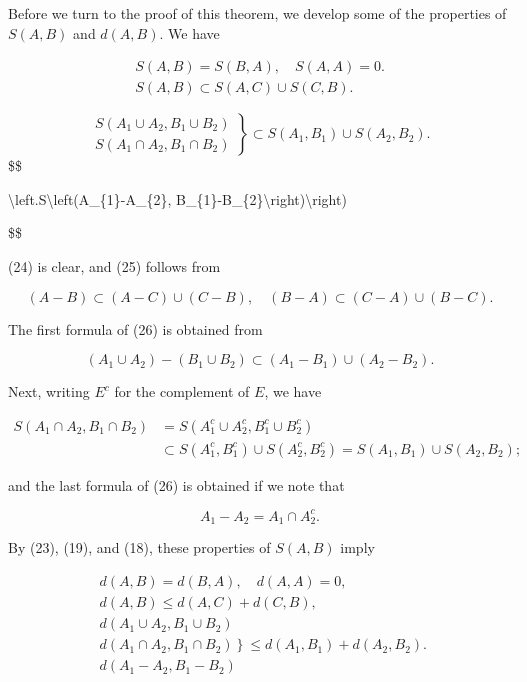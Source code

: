 \documentclass[10pt]{article}
\begin{document}
Before we turn to the proof of this theorem, we develop some of the properties of $S(A, B)$ and $d(A, B)$. We have

$$
\begin{gathered}
S(A, B)=S(B, A), \quad S(A, A)=0 . \\
S(A, B) \subset S(A, C) \cup S(C, B) .
\end{gathered}
$$

$$
\left.\begin{array}{l}
S\left(A_{1} \cup A_{2}, B_{1} \cup B_{2}\right) \\
S\left(A_{1} \cap A_{2}, B_{1} \cap B_{2}\right)
\end{array}\right\} \subset S\left(A_{1}, B_{1}\right) \cup S\left(A_{2}, B_{2}\right) .
$$\$\$

\textbackslash left.S\textbackslash left(A\_\{1\}-A\_\{2\}, B\_\{1\}-B\_\{2\}\textbackslash right)\textbackslash right)

\$\$

(24) is clear, and (25) follows from

$$
(A-B) \subset(A-C) \cup(C-B), \quad(B-A) \subset(C-A) \cup(B-C) .
$$

The first formula of (26) is obtained from

$$
\left(A_{1} \cup A_{2}\right)-\left(B_{1} \cup B_{2}\right) \subset\left(A_{1}-B_{1}\right) \cup\left(A_{2}-B_{2}\right) .
$$

Next, writing $E^{c}$ for the complement of $E$, we have

$$
\begin{aligned}
S\left(A_{1} \cap A_{2}, B_{1} \cap B_{2}\right) & =S\left(A_{1}^{c} \cup A_{2}^{c}, B_{1}^{c} \cup B_{2}^{c}\right) \\
& \subset S\left(A_{1}^{c}, B_{1}^{c}\right) \cup S\left(A_{2}^{c}, B_{2}^{c}\right)=S\left(A_{1}, B_{1}\right) \cup S\left(A_{2}, B_{2}\right) ;
\end{aligned}
$$

and the last formula of (26) is obtained if we note that

$$
A_{1}-A_{2}=A_{1} \cap A_{2}^{c} .
$$

By (23), (19), and (18), these properties of $S(A, B)$ imply

$$
\begin{aligned}
& d(A, B)=d(B, A), \quad d(A, A)=0, \\
& d(A, B) \leq d(A, C)+d(C, B), \\
& d\left(A_{1} \cup A_{2}, B_{1} \cup B_{2}\right) \\
& \left.d\left(A_{1} \cap A_{2}, B_{1} \cap B_{2}\right)\right\} \leq d\left(A_{1}, B_{1}\right)+d\left(A_{2}, B_{2}\right) \text {. } \\
& d\left(A_{1}-A_{2}, B_{1}-B_{2}\right)
\end{aligned}
$$
\end{document}
